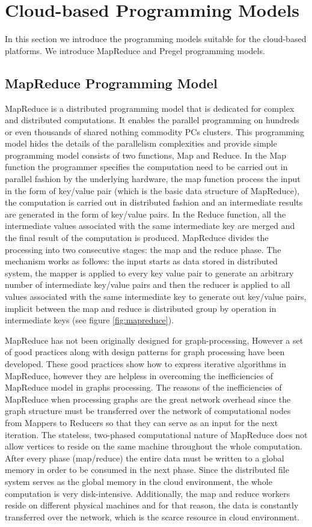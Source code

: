 \section {Cloud-based Programming Models}
In this section we introduce the programming models suitable for the cloud-based platforms. We introduce MapReduce and Pregel programming models.
\subsection{MapReduce Programming Model}
MapReduce\cite{DeGh08} is a distributed programming model that is dedicated for complex and distributed computations. It enables the parallel programming on hundreds or even thousands of shared nothing commodity PCs clusters. This programming model hides the details of the parallelism complexities and provide simple programming model consists of two functions, Map and Reduce. In the Map function the programmer specifies the computation need to be carried out in parallel fashion by the underlying hardware, the map function process the input in the form of key/value pair (which is the basic data structure of MapReduce), the computation is carried out in distributed fashion and an intermediate results are generated in the form of key/value pairs. In the Reduce function, all the intermediate values associated with the same intermediate key are merged and the final result of the computation is produced. 
MapReduce divides the processing into two consecutive stages: the map and the reduce phase. The mechanism works as follows: the input starts as data stored in distributed system, the mapper is applied to every key value pair to generate an arbitrary number of intermediate key/value pairs and then the reducer is applied to all values associated with the same intermediate key to generate out key/value pairs, implicit between the map and reduce is distributed group by operation in intermediate keys (see figure \ref{fig:mapreduce}).

MapReduce has not been originally designed for graph-processing, However a set of good practices along with design patterns for graph processing have been developed. These good practices show how to express iterative algorithms in MapReduce, however they are helpless in overcoming the inefficiencies of MapReduce model in graphs processing\cite{KIK*12}. The reasons of the inefficiencies of MapReduce when processing graphs are the great network overhead since the graph structure must be transferred over the network of computational nodes from Mappers to Reducers so that they can serve as an input for the next iteration.  The stateless, two-phased computational nature of MapReduce does not allow vertices to reside on the same machine throughout the whole computation.  After every phase (map/reduce) the entire data must be written to a global memory in order to be consumed in the next phase. Since the distributed file system serves as the global memory in the cloud environment, the whole computation is very disk-intensive. Additionally, the map and reduce workers reside on different physical machines and for that reason, the data is constantly transferred over the network, which is the scarce resource in cloud environment\cite{KIK*12}.

